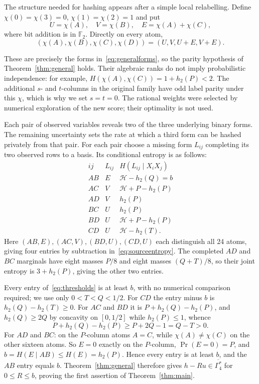 \documentclass[a4paper,11pt]{article}
\newcommand{\F}{\mathbb F_2}
\newcommand{\AEcone}{\overline{\Gamma_4^{*}}}
\newcommand{\hb}{h_2}
\begin{document}
\begin{samepage}
The structure needed for hashing appears after a simple local relabelling.
Define $\chi(0)=\chi(3)=0$, $\chi(1)=\chi(2)=1$ and put
\[
 U=\chi(A),\quad V=\chi(B),\quad E=\chi(A)+\chi(C),
\]
where bit addition is in $\F$. Directly on every atom,
\begin{equation}\label{eq:forms}
 (\chi(A),\chi(B),\chi(C),\chi(D))=(U,V,U+E,V+E).
\end{equation}
\end{samepage}
These are precisely the forms in~\eqref{eq:generalforms}, so the
parity hypothesis of Theorem~\ref{thm:general} holds. Their algebraic
ranks do not imply probabilistic independence: for example,
$H(\chi(A),\chi(C))=1+\hb(P)<2$.
The additional $s$- and $t$-columns in the original family have odd
label parity under this $\chi$, which is why we set $s=t=0$.
The rational weights were selected by numerical exploration of the
new score; their optimality is not used.

Each pair of observed variables reveals two of the three underlying binary
forms. The remaining uncertainty sets the rate at which a third form can
be hashed privately from that pair. For each pair choose a missing form $L_{ij}$ completing its two observed
rows to a basis. Its conditional entropy is as follows:
\begin{equation}\label{eq:thresholds}
\begin{array}{c|c|c}
 ij&L_{ij}&H(L_{ij}\mid X_iX_j)\\\hline
 AB&E&\mathcal H-\hb(Q)=b\\
 AC&V&\mathcal H+P-\hb(P)\\
 AD&V&\hb(P)\\
 BC&U&\hb(P)\\
 BD&U&\mathcal H+P-\hb(P)\\
 CD&U&\mathcal H-\hb(T).
\end{array}
\end{equation}
Here $(AB,E),(AC,V),(BD,U),(CD,U)$ each distinguish all 24 atoms, giving
four entries by subtraction in~\eqref{eq:sourceentropy}. The completed
$AD$ and $BC$ marginals have eight masses $P/8$ and eight masses $(Q+T)/8$,
so their joint entropy is $3+\hb(P)$, giving the other two entries.

Every entry of~\eqref{eq:thresholds} is at least $b$, with no numerical
comparison required; we use only $0<T<Q<1/2$. For $CD$ the entry minus $b$
is $\hb(Q)-\hb(T)\ge0$. For $AC$ and $BD$ it is $P+\hb(Q)-\hb(P)$, and
$\hb(Q)\ge2Q$ by concavity on $[0,1/2]$ while $\hb(P)\le1$, whence
\[
 P+\hb(Q)-\hb(P)\ge P+2Q-1=Q-T>0.
\]
For $AD$ and $BC$: on the $P$-column atoms $A=C$, while $\chi(A)\ne\chi(C)$
on the other sixteen atoms. So $E=0$ exactly on the $P$-column,
$\Pr(E=0)=P$, and $b=H(E\mid AB)\le H(E)=\hb(P)$. Hence every entry
is at least $b$, and the $AB$ entry equals $b$.
Theorem~\ref{thm:general} therefore gives $h-Ru\in\AEcone$ for
$0\le R\le b$, proving the first assertion of Theorem~\ref{thm:main}.
\end{document}
